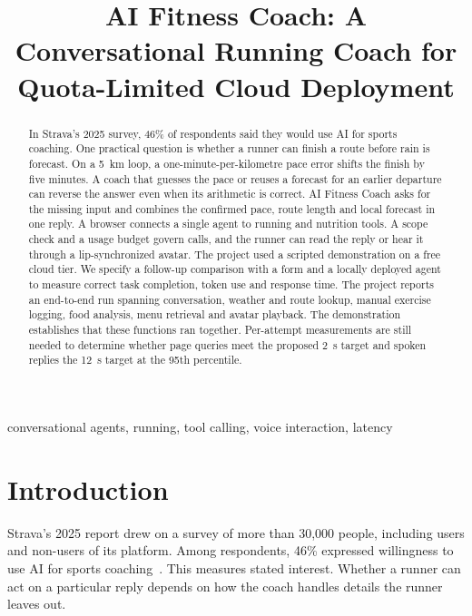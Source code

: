 \documentclass[conference]{IEEEtran}
\begin{document}
\title{AI Fitness Coach: A Conversational Running Coach for Quota-Limited Cloud Deployment}
\author{}
\maketitle
\begin{abstract}
In Strava's 2025 survey, 46\% of respondents said they would use AI for sports coaching. One practical question is whether a runner can finish a route before rain is forecast.
On a 5~km loop, a one-minute-per-kilometre pace error shifts the finish by five minutes. A coach that guesses the pace or reuses a forecast for an earlier departure can reverse the answer even when its arithmetic is correct.
AI Fitness Coach asks for the missing input and combines the confirmed pace, route length and local forecast in one reply.
A browser connects a single agent to running and nutrition tools. A scope check and a usage budget govern calls, and the runner can read the reply or hear it through a lip-synchronized avatar.
The project used a scripted demonstration on a free cloud tier. We specify a follow-up comparison with a form and a locally deployed agent to measure correct task completion, token use and response time.
The project reports an end-to-end run spanning conversation, weather and route lookup, manual exercise logging, food analysis, menu retrieval and avatar playback. The demonstration establishes that these functions ran together. Per-attempt measurements are still needed to determine whether page queries meet the proposed 2~s target and spoken replies the 12~s target at the 95th percentile.
\end{abstract}
\begin{IEEEkeywords}
conversational agents, running, tool calling, voice interaction, latency
\end{IEEEkeywords}
\section{Introduction}
Strava's 2025 report drew on a survey of more than 30,000 people, including users and non-users of its platform. Among respondents, 46\% expressed willingness to use AI for sports coaching~\cite{strava}. This measures stated interest. Whether a runner can act on a particular reply depends on how the coach handles details the runner leaves out.
\end{document}
